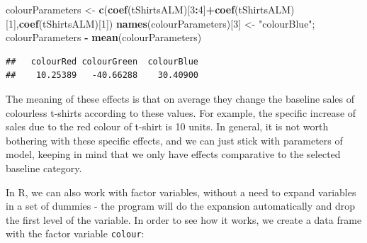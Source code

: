 \documentclass[
]{book}
\newenvironment{Shaded}{\begin{snugshade}}{\end{snugshade}}
\newcommand{\DecValTok}[1]{\textcolor[rgb]{0.00,0.00,0.81}{#1}}
\newcommand{\KeywordTok}[1]{\textcolor[rgb]{0.13,0.29,0.53}{\textbf{#1}}}
\newcommand{\NormalTok}[1]{#1}
\newcommand{\OperatorTok}[1]{\textcolor[rgb]{0.81,0.36,0.00}{\textbf{#1}}}
\newcommand{\StringTok}[1]{\textcolor[rgb]{0.31,0.60,0.02}{#1}}
\theoremstyle{definition}
\theoremstyle{definition}
\theoremstyle{definition}
\theoremstyle{definition}
\theoremstyle{remark}
\begin{document}
\begin{Shaded}
\begin{Highlighting}[]
\NormalTok{colourParameters \textless{}{-}}\StringTok{ }\KeywordTok{c}\NormalTok{(}\KeywordTok{coef}\NormalTok{(tShirtsALM)[}\DecValTok{3}\OperatorTok{:}\DecValTok{4}\NormalTok{]}\OperatorTok{+}\KeywordTok{coef}\NormalTok{(tShirtsALM)[}\DecValTok{1}\NormalTok{],}\KeywordTok{coef}\NormalTok{(tShirtsALM)[}\DecValTok{1}\NormalTok{])}
\KeywordTok{names}\NormalTok{(colourParameters)[}\DecValTok{3}\NormalTok{] \textless{}{-}}\StringTok{ "colourBlue"}\NormalTok{;}
\NormalTok{colourParameters }\OperatorTok{{-}}\StringTok{ }\KeywordTok{mean}\NormalTok{(colourParameters)}
\end{Highlighting}
\end{Shaded}

\begin{verbatim}
##   colourRed colourGreen  colourBlue 
##    10.25389   -40.66288    30.40900
\end{verbatim}

The meaning of these effects is that on average they change the baseline sales of colourless t-shirts according to these values. For example, the specific increase of sales due to the red colour of t-shirt is 10 units. In general, it is not worth bothering with these specific effects, and we can just stick with parameters of model, keeping in mind that we only have effects comparative to the selected baseline category.

In R, we can also work with factor variables, without a need to expand variables in a set of dummies - the program will do the expansion automatically and drop the first level of the variable. In order to see how it works, we create a data frame with the factor variable \texttt{colour}:

\begin{Shaded}
\end{Shaded}
\end{document}
